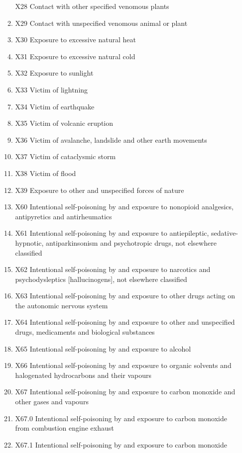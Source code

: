 \documentclass[
]{scrartcl}
\begin{document}
\begin{itemize}
\begin{enumerate}
    X28 Contact with other specified venomous plants
  \item
    X29 Contact with unspecified venomous animal or plant
  \item
    X30 Exposure to excessive natural heat
  \item
    X31 Exposure to excessive natural cold
  \item
    X32 Exposure to sunlight
  \item
    X33 Victim of lightning
  \item
    X34 Victim of earthquake
  \item
    X35 Victim of volcanic eruption
  \item
    X36 Victim of avalanche, landslide and other earth movements
  \item
    X37 Victim of cataclysmic storm
  \item
    X38 Victim of flood
  \item
    X39 Exposure to other and unspecified forces of nature
  \item
    X60 Intentional self-poisoning by and exposure to nonopioid
    analgesics, antipyretics and antirheumatics
  \item
    X61 Intentional self-poisoning by and exposure to antiepileptic,
    sedative-hypnotic, antiparkinsonism and psychotropic drugs, not
    elsewhere classified
  \item
    X62 Intentional self-poisoning by and exposure to narcotics and
    psychodysleptics {[}hallucinogens{]}, not elsewhere classified
  \item
    X63 Intentional self-poisoning by and exposure to other drugs acting
    on the autonomic nervous system
  \item
    X64 Intentional self-poisoning by and exposure to other and
    unspecified drugs, medicaments and biological substances
  \item
    X65 Intentional self-poisoning by and exposure to alcohol
  \item
    X66 Intentional self-poisoning by and exposure to organic solvents
    and halogenated hydrocarbons and their vapours
  \item
    X67 Intentional self-poisoning by and exposure to carbon monoxide
    and other gases and vapours
  \item
    X67.0 Intentional self-poisoning by and exposure to carbon monoxide
    from combustion engine exhaust
  \item
    X67.1 Intentional self-poisoning by and exposure to carbon monoxide

\end{enumerate}
\end{itemize}
\end{document}
